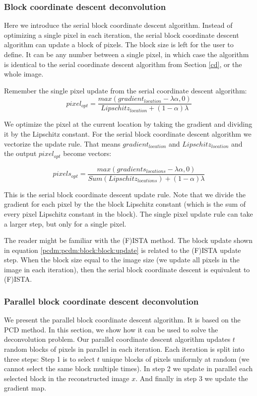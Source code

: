 \subsubsection{Block coordinate descent deconvolution}
Here we introduce the serial block coordinate descent algorithm. Instead of optimizing a single pixel in each iteration, the serial block coordinate descent algorithm can update a block of pixels. The block size is left for the user to define. It can be any number between a single pixel, in which case the algorithm is identical to the serial coordinate descent algorithm from Section \ref{cd}, or the whole image.

Remember the single pixel update from the serial coordinate descent algorithm: 
\begin{equation} \label{pcdm:pcdm:block:single:update}
pixel_{opt} = \frac{max(gradient_{location} - \lambda\alpha, 0)}{Lipschitz_{location} + (1 - \alpha)\lambda}
\end{equation}

We optimize the pixel at the current location by taking the gradient and dividing it by the Lipschitz constant. For the serial block coordinate descent algorithm we vectorize the update rule. That means $gradient_{location}$ and $Lipschitz_{location}$ and the output $pixel_{opt}$ become vectors:

\begin{equation} \label{pcdm:pcdm:block:block:update}
pixels_{opt} = \frac{max(gradients_{locations} - \lambda\alpha, 0)}{Sum(Lipschitz_{locations}) + (1 - \alpha)\lambda}
\end{equation}

This is the serial block coordinate descent update rule. Note that we divide the gradient for each pixel by the the block Lipschitz constant (which is the sum of every pixel Lipschitz constant in the block). The single pixel update rule can take a larger step, but only for a single pixel. 

The reader might be familiar with the (F)ISTA method\cite{beck2009fista}. The block update shown in equation \eqref{pcdm:pcdm:block:block:update} is related to the (F)ISTA update step. When the block size equal to the image size (we update all pixels in the image in each iteration), then the serial block coordinate descent is equivalent to (F)ISTA.


\subsubsection{Parallel block coordinate descent deconvolution}
We present the parallel block coordinate descent algorithm. It is based on the PCD method\cite{richtarik2016parallel}. In this section, we show how it can be used to solve the deconvolution problem. Our parallel coordinate descent algorithm updates $t$ random blocks of pixels in parallel in each iteration. Each iteration is split into three steps: Step 1 is to select $t$ unique blocks of pixels uniformly at random (we cannot select the same block multiple times). In step 2 we update in parallel each selected block in the reconstructed image $x$. And finally in step 3 we update the gradient map.

